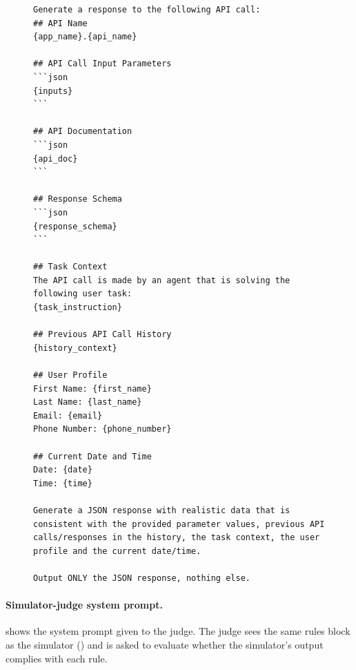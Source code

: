 \begin{figure}[t]
\begin{lstlisting}[style=prettyprompt, captionpos=b, caption={Simulator user prompt template (one per simulated API call).}, label={lst:sim_user_prompt}]
Generate a response to the following API call:
## API Name
{app_name}.{api_name}

## API Call Input Parameters
```json
{inputs}
```

## API Documentation
```json
{api_doc}
```

## Response Schema
```json
{response_schema}
```

## Task Context
The API call is made by an agent that is solving the following user task:
{task_instruction}

## Previous API Call History
{history_context}

## User Profile
First Name: {first_name}
Last Name: {last_name}
Email: {email}
Phone Number: {phone_number}

## Current Date and Time
Date: {date}
Time: {time}

Generate a JSON response with realistic data that is consistent with the provided parameter values, previous API calls/responses in the history, the task context, the user profile and the current date/time.

Output ONLY the JSON response, nothing else.
\end{lstlisting}
\end{figure}


\paragraph{Simulator-judge system prompt.}
 shows the system prompt given to the judge. The judge sees the same rules block as the simulator () and is asked to evaluate whether the simulator's output complies with each rule.

